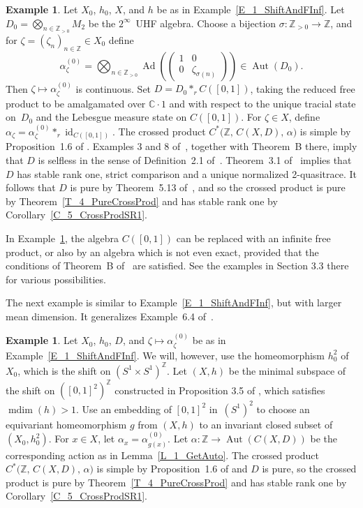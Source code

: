 \documentclass[10pt]{amsart}
\numberwithin{equation}{section}
\theoremstyle{definition}
\newtheorem{exa}[thm]{Example}
\newcommand{\af}{\alpha}
\newcommand{\zt}{\zeta}
\newcommand{\sm}{\sigma}
\newcommand{\Z}{{\mathbb{Z}}}
\newcommand{\C}{{\mathbb{C}}}
\newcommand{\N}{{\mathbb{Z}}_{> 0}}
\newcommand{\id}{{\operatorname{id}}}
\newcommand{\Aut}{{\operatorname{Aut}}}
\newcommand{\Ad}{{\operatorname{Ad}}}
\newcommand{\mdim}{{\operatorname{mdim}}}
\newcommand{\tst}{tracial state}
\newcommand{\ct}{continuous}
\newcommand{\hme}{homeomorphism}
\begin{document}
\begin{exa}\label{E_2_ShiftAndFInf}
Let $X_0$, $h_0$, $X$, and $h$
be as in Example~\ref{E_1_ShiftAndFInf}.
Let $D_0 = \bigotimes_{n \in \N} M_2$ be the $2^{\infty}$~UHF algebra.
Choose a bijection $\sm \colon \N \to \Z$,
and for $\zt = (\zt_n)_{n \in \Z} \in X_0$ define
\[
\af_{\zt}^{(0)}
 = \bigotimes_{n \in \N}
  \Ad \left( \left( \begin{matrix}
       1 & 0 \\
       0 & \zt_{\sm (n)}
     \end{matrix} \right) \right)
 \in \Aut (D_0).
\]
Then $\zt \mapsto \af_{\zt}^{(0)}$ is \ct.
Set $D = D_0 \ast_{r} C ([0, 1])$,
taking the reduced free product to be amalgamated over $\C \cdot 1$
and with respect to the unique \tst{} on~$D_0$
and the Lebesgue measure state on $C ([0, 1])$.
For $\zt \in X$,
define $\af_{\zt} = \af_{\zt}^{(0)} \ast_{r} \id_{C ([0, 1])}$.
The crossed product $C^* \bigl( \Z, \, C (X, D), \, \af \bigr)$ is
simple by Proposition~1.6 of \cite{ArBcPh2}.
Examples 3 and 8 of~\cite{HKER}, together with Theorem~B there,
imply that $D$ is selfless in the sense of Definition~2.1
of~\cite{Rob}. Theorem~3.1 of~\cite{Rob} implies that $D$ has
stable rank one, strict comparison and a unique normalized
2-quasitrace. It follows that $D$ is pure by Theorem~5.13
of~\cite{AnPrTlVt}, and so the crossed product is pure by
Theorem~\ref{T_4_PureCrossProd} and has stable rank one
by Corollary~\ref{C_5_CrossProdSR1}.
\end{exa}

In Example~\ref{E_2_ShiftAndFInf}, the algebra $C ([0, 1])$
can be replaced with an infinite free product, or also by an algebra
which is not even exact, provided that the conditions of Theorem~B
of~\cite{HKER} are satisfied. See the examples in Section 3.3 there
for various possibilities.

The next example is similar to Example~\ref{E_1_ShiftAndFInf},
but with larger mean dimension.
It generalizes Example~6.4 of~\cite{ArBcPh2}.

\begin{exa}\label{E_3_ShiftAndFInf}
Let $X_0$, $h_0$, $D$, and $\zt \mapsto \af_{\zt}^{(0)}$
be as in Example~\ref{E_1_ShiftAndFInf}.
We will, however, use the \hme{} $h_0^2$ of~$X_0$,
which is the shift on $(S^1 \times S^1)^{\Z}$.
Let $(X, h)$ be the minimal subspace of the shift on
$([0, 1]^2)^{\Z}$
constructed in Proposition 3.5 of \cite{LndWs},
which satisfies $\mdim (h) > 1$.
Use an embedding of $[0, 1]^2$ in~$(S^1)^2$
to choose an equivariant \hme{} $g$
from $(X, h)$ to an invariant closed subset of $(X_0, h_0^2)$.
For $x \in X$, let $\af_{x} = \af_{g (x)}^{(0)}$.
Let $\af \colon \Z \to \Aut (C (X, D))$
be the corresponding action as in Lemma~\ref{L_1_GetAuto}.
The crossed product
$C^* \bigl( \Z, \, C (X, D), \, \af \bigr)$ is
simple by Proposition~1.6 of \cite{ArBcPh2} and $D$ is
pure, so the crossed product is pure by Theorem~\ref{T_4_PureCrossProd}
and has stable rank one by
Corollary~\ref{C_5_CrossProdSR1}.
\end{exa}
\end{document}
